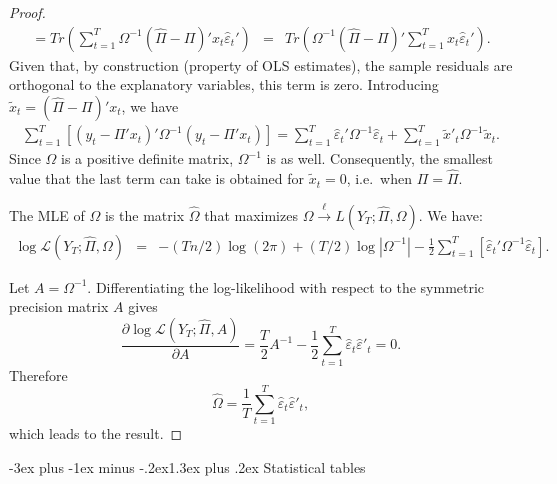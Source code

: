\documentclass[
  11pt,
]{book}
\makeatletter
\renewcommand\section{\@startsection{section}{1}{\z@}
  {-3ex plus -1ex minus -.2ex}{1.3ex plus .2ex}
  {\normalfont\Large\bfseries\color{TextbookInk}}}
\theoremstyle{definition}
\theoremstyle{definition}
\theoremstyle{definition}
\theoremstyle{definition}
\theoremstyle{remark}
\makeatother
\begin{document}
\begin{proof}
\begin{eqnarray*}
=  Tr\left(\sum_{t=1}^{T}\Omega^{-1}(\hat{\Pi}-\Pi)'x_{t}\hat{\varepsilon}_{t}'\right) & = & Tr\left(\Omega^{-1}(\hat{\Pi}-\Pi)'\sum_{t=1}^{T}x_{t}\hat{\varepsilon}_{t}'\right).
\end{eqnarray*}
Given that, by construction (property of OLS estimates), the sample residuals are orthogonal to the explanatory variables, this term is zero. Introducing \(\tilde{x}_{t}=(\hat{\Pi}-\Pi)'x_{t}\), we have
\begin{eqnarray*}
\sum_{t=1}^{T}\left[\left(y_{t}-\Pi'x_{t}\right)'\Omega^{-1}\left(y_{t}-\Pi'x_{t}\right)\right] =\sum_{t=1}^{T}\hat{\varepsilon}_{t}'\Omega^{-1}\hat{\varepsilon}_{t}+\sum_{t=1}^{T}\tilde{x}'_{t}\Omega^{-1}\tilde{x}_{t}.
\end{eqnarray*}
Since \(\Omega\) is a positive definite matrix, \(\Omega^{-1}\) is as well. Consequently, the smallest value that the last term can take is obtained for \(\tilde{x}_{t}=0\), i.e.~when \(\Pi=\hat{\Pi}.\)

The MLE of \(\Omega\) is the matrix \(\hat{\Omega}\) that maximizes \(\Omega\overset{\ell}{\rightarrow}L(Y_{T};\hat{\Pi},\Omega)\). We have:
\begin{eqnarray*}
\log\mathcal{L}(Y_{T};\hat{\Pi},\Omega) & = & -(Tn/2)\log(2\pi)+(T/2)\log\left|\Omega^{-1}\right| -\frac{1}{2}\sum_{t=1}^{T}\left[\hat{\varepsilon}_{t}'\Omega^{-1}\hat{\varepsilon}_{t}\right].
\end{eqnarray*}

Let \(A=\Omega^{-1}\). Differentiating the log-likelihood with respect to the symmetric precision matrix \(A\) gives
\[
\frac{\partial \log\mathcal{L}(Y_{T};\hat{\Pi},A)}{\partial A}=\frac{T}{2}A^{-1}-\frac{1}{2}\sum_{t=1}^{T}\hat{\varepsilon}_{t}\hat{\varepsilon}'_{t}=0.
\]
Therefore
\[
\hat{\Omega}=\frac{1}{T}\sum_{t=1}^{T}\hat{\varepsilon}_{t}\hat{\varepsilon}'_{t},
\]
which leads to the result.
\end{proof}

\section{Statistical tables}\label{statistical-tables}

\begingroup\fontsize{9.5}{11.5}\selectfont
\end{document}
